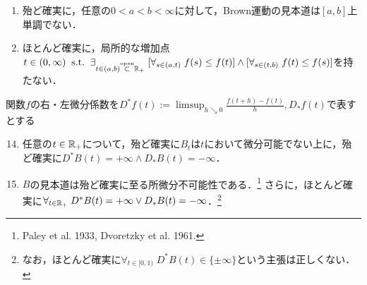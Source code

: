 \documentclass[uplatex,dvipdfmx]{jsreport}
\begin{document}
\begin{proposition}
\begin{enumerate}
        \item 殆ど確実に，任意の$0<a<b<\infty$に対して，Brown運動の見本道は$[a,b]$上単調でない．
        \item ほとんど確実に，局所的な増加点$t\in(0,\infty)\;\;\mathrm{s.t.}\;\;\exists_{t\in(a,b)\overset{\mathrm{open}}{\subset}\mathbb{R}_+}\;[\forall_{s\in(a,t)}\;f(s)\le f(t)]\land[\forall_{s\in(t,b)}\;f(t)\le f(s)]$を持たない．
    \end{enumerate}
    関数$f$の右・左微分係数を$D^*f(t):=\limsup_{h\searrow0}\frac{f(t+h)-f(t)}{h},D_*f(t)$で表すとする
    \begin{enumerate}\setcounter{enumi}{13}
        \item 任意の$t\in\mathbb{R}_+$について，殆ど確実に$B_t$は$t$において微分可能でない上に，殆ど確実に$D^*B(t)=+\infty\land D_*B(t)=-\infty$．
        \item $B$の見本道は殆ど確実に至る所微分不可能性である．\footnote{Paley et al. 1933, Dvoretzky et al. 1961.}
        さらに，ほとんど確実に$\forall_{t\in\mathbb{R}_+}\;D^*B(t)=+\infty\lor D_*B(t)=-\infty$．\footnote{なお，ほとんど確実に$\forall_{t\in[0,1)}\;D^*B(t)\in\{\pm\infty\}$という主張は正しくない．}
    \end{enumerate}
\end{proposition}
\end{document}
